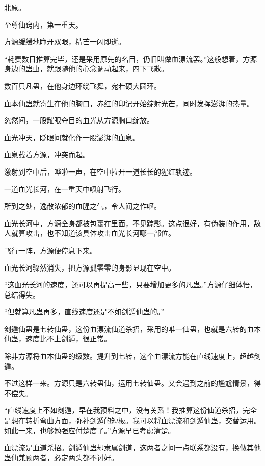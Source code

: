 
\begin{this_body}



北原。

至尊仙窍内，第一重天。

方源缓缓地睁开双眼，精芒一闪即逝。

“耗费数日推算完毕，还是采用原先的名目，仍旧叫做血漂流罢。”这般想着，方源身边的蛊虫，就跟随他的心念调动起来，四下飞散。

数百只凡蛊，在他身边环绕飞舞，宛若硕大圆环。

血本仙蛊就寄生在他的胸口，赤红的印记开始绽射光芒，同时发挥澎湃的热量。

忽然间，一股耀眼夺目的血光从方源胸口绽放。

血光冲天，眨眼间就化作一股澎湃的血泉。

血泉载着方源，冲突而起。

激射到空中后，哗啦一声，在空中拉开一道长长的猩红轨迹。

一道血光长河，在一重天中喷射飞行。

所到之处，逸散浓郁的血腥之气，令人闻之作呕。

血光长河中，方源全身都被包裹在里面，不见踪影。这点很好，有伪装的作用，敌人就算攻击，也不知道该具体攻击血光长河哪一部位。

飞行一阵，方源便停息下来。

血光长河骤然消失，把方源孤零零的身影显现在空中。

“这血光长河的速度，还可以再提高一些，只要增加更多的凡蛊。”方源仔细体悟，总结得失。

“但就算凡蛊再多，直线速度还是不如剑遁仙蛊的。”

剑遁仙蛊是七转仙蛊，这份血漂流仙道杀招，采用的唯一仙蛊，也就是六转的血本仙蛊，速度比不上剑遁，很正常。

除非方源将血本仙蛊的级数。提升到七转，这个血漂流方能在直线速度上，超越剑遁。

不过这样一来。方源只是六转蛊仙，运用七转仙蛊。又会遇到之前的尴尬情景，得不偿失。

“直线速度上不如剑遁，早在我预料之中，没有关系！我推算这份仙道杀招，完全是想在转折弯曲方面，弥补剑遁的短板。我可以将血漂流和剑遁仙蛊，交替运用。如此一来，也够勉强应付楚度了。”方源早已考虑清楚。

血漂流是血道杀招。剑遁仙蛊却隶属剑道，这两者之间一点联系都没有，换做其他蛊仙兼顾两者，必定两头都不讨好。


\end{this_body}

